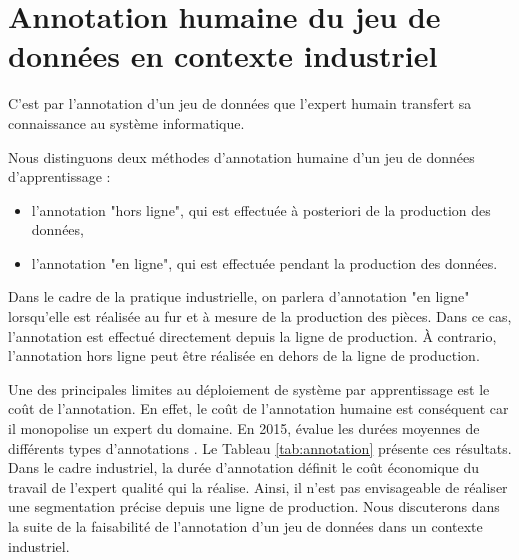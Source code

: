 
\newpage

\section{Annotation humaine du jeu de données en contexte industriel}
C'est par l'annotation d'un jeu de données que l'expert humain transfert sa connaissance au système informatique.

Nous distinguons deux méthodes d'annotation humaine d'un jeu de données d'apprentissage :
\begin{itemize}
    \item l'annotation "hors ligne", qui est effectuée à posteriori de la production des données,
    \item l'annotation "en ligne", qui est effectuée pendant la production des données.
\end{itemize}
Dans le cadre de la pratique industrielle, on parlera d'annotation "en ligne" lorsqu'elle est réalisée au fur et à mesure de la production des pièces.
Dans ce cas, l'annotation est effectué directement depuis la ligne de production.
À contrario, l'annotation hors ligne peut être réalisée en dehors de la ligne de production.

Une des principales limites au déploiement de système par apprentissage est le coût de l'annotation.
En effet, le coût de l'annotation humaine est conséquent car il monopolise un expert du domaine.
En 2015, \citeauthor{bearman_what_2015} évalue les durées moyennes de différents types d'annotations \cite{bearman_what_2015}.
Le Tableau \ref{tab:annotation} présente ces résultats.
Dans le cadre industriel, la durée d'annotation définit le coût économique du travail de l'expert qualité qui la réalise.
Ainsi, il n'est pas envisageable de réaliser une segmentation précise depuis une ligne de production.
Nous discuterons dans la suite de la faisabilité de l'annotation d'un jeu de données dans un contexte industriel.

